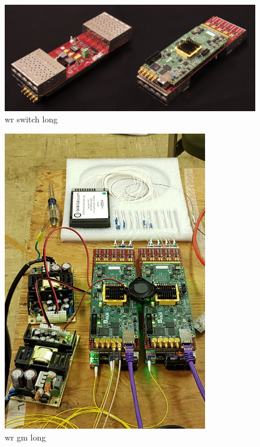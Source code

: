 \begin{figure} %
    \includegraphics[width=\textwidth]{diagrams/6-daq/wr_switch.jpg}
    \caption[wr switch short]
    {wr switch long}
    \label{fig:wr_switch}
\end{figure} %

\begin{figure} %
    \includegraphics[width=0.8\textwidth]{diagrams/6-daq/wr_gm.jpg}
    \caption[wr gm short]
    {wr gm long}
    \label{fig:wr_gm}
\end{figure} %

